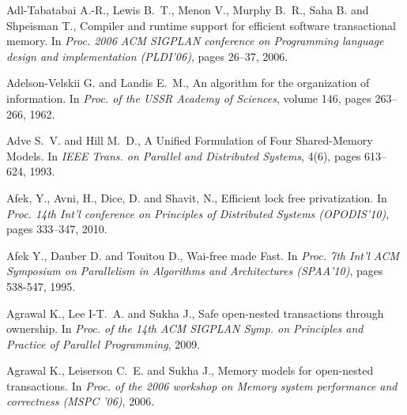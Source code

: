 \begin{thebibliography}{99}
\small{




Adl-Tabatabai A.-R., Lewis B.~T., Menon V., Murphy B.~R., 
  Saha B. and Shpeisman T.,
\newblock Compiler and runtime support for efficient software transactional
  memory.
\newblock In {\em Proc. 2006 ACM SIGPLAN conference on
  Programming language design and implementation (PLDI'06)}, pages 26--37, 2006.



Adelson-Velskii G. and Landis E.~M.,
\newblock An algorithm for the organization of information.
\newblock In {\em Proc. of the USSR Academy of Sciences}, volume 146, pages
  263--266, 1962.


Adve S.~V. and Hill M.~D.,
\newblock A Unified Formulation of Four Shared-Memory Models.
\newblock In {\em IEEE Trans. on Parallel and Distributed Systems}, 4(6), pages 613--624, 1993.


 Afek, Y.,  Avni, H.,   Dice, D. and  Shavit, N.,
Efficient lock free privatization. 
In {\it Proc.  14th Int'l conference on Principles of Distributed Systems 
(OPODIS'10)}, pages 333--347,  2010.



Afek Y., Dauber D. and Touitou D.,
Wai-free made Fast. 
In {\it Proc. 7th  Int'l  ACM Symposium on Parallelism in Algorithms 
and Architectures   (SPAA'10)},  pages 538-547,  1995. 






Agrawal K., Lee I-T.~A. and Sukha J.,
\newblock Safe open-nested transactions through ownership.
\newblock In {\em Proc. of the 14th ACM SIGPLAN Symp. on Principles and
  Practice of Parallel Programming}, 2009.

Agrawal K., Leiserson C.~E. and Sukha J.,
\newblock Memory models for open-nested transactions.
\newblock In {\em Proc. of the 2006 workshop on Memory system
  performance and correctness (MSPC '06)}, 2006.


}
\end{thebibliography}
